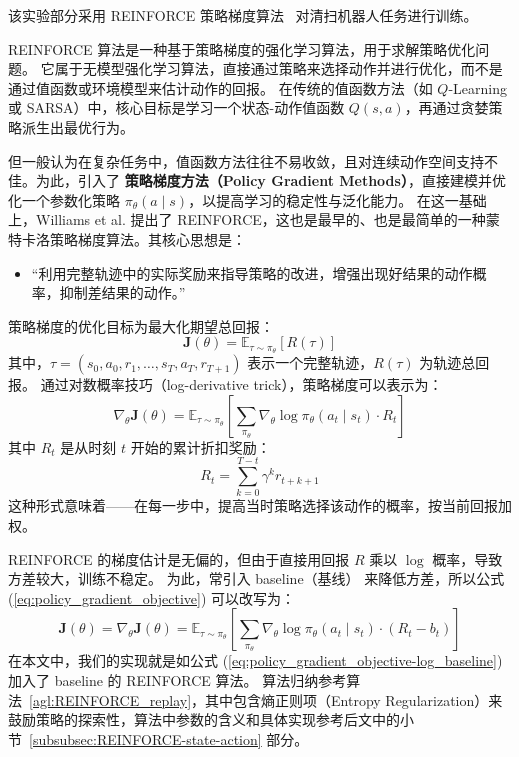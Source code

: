 该实验部分采用 REINFORCE 策略梯度算法~\cite{DBLP:journals/ml/Williams92} 对清扫机器人任务进行训练。

REINFORCE 算法是一种基于策略梯度的强化学习算法，用于求解策略优化问题。
它属于无模型强化学习算法，直接通过策略来选择动作并进行优化，而不是通过值函数或环境模型来估计动作的回报。
在传统的值函数方法（如 \(Q\)-Learning 或 SARSA）中，核心目标是学习一个状态-动作值函数 \(Q \left( s, a \right)\)，再通过贪婪策略派生出最优行为。

但一般认为在复杂任务中，值函数方法往往不易收敛，且对连续动作空间支持不佳。为此，引入了 \textbf{策略梯度方法（Policy Gradient Methods）}，直接建模并优化一个参数化策略 \(\pi_{\theta} \left( a \mid s \right) \)，以提高学习的稳定性与泛化能力。
在这一基础上，Williams et al. 提出了 REINFORCE，这也是最早的、也是最简单的一种蒙特卡洛策略梯度算法。其核心思想是：
\begin{itemize}
    \item “利用完整轨迹中的实际奖励来指导策略的改进，增强出现好结果的动作概率，抑制差结果的动作。”
\end{itemize}

策略梯度的优化目标为最大化期望总回报：
\begin{equation}\label{eq:policy_gradient_objective}
    \mathbf{J} \left( \theta \right) = \mathbb{E}_{\tau \sim \pi_{\theta}} \left[ R \left( \tau \right) \right]
\end{equation}
其中，\(\tau = \left(s_0, a_0, r_1, \dots, s_T, a_T, r_{T+1}\right)\) 表示一个完整轨迹，\(R \left( \tau \right)\) 为轨迹总回报。
通过对数概率技巧（log-derivative trick），策略梯度可以表示为：
\begin{equation}\label{eq:policy_gradient-log}
    \nabla_{\theta} \mathbf{J} \left( \theta \right) = \mathbb{E}_{\tau \sim \pi_{\theta}} \left[ \sum_{\pi_\theta} \nabla_{\theta} \log \pi_{\theta} \left( a_t \mid s_t \right) \cdot R_t \right]
\end{equation}
其中 \(R_t\) 是从时刻 \(t\) 开始的累计折扣奖励：
\[
    R_t = \sum_{k=0}^{T-t} \gamma^k r_{t+k+1}
\]
这种形式意味着——在每一步中，提高当时策略选择该动作的概率，按当前回报加权。

REINFORCE 的梯度估计是无偏的，但由于直接用回报 \(R\) 乘以 \(\log\) 概率，导致方差较大，训练不稳定。
为此，常引入 baseline（基线） 来降低方差，所以公式 (\ref{eq:policy_gradient_objective}) 可以改写为：
\begin{equation}\label{eq:policy_gradient_objective-log_baseline}
    \mathbf{J} \left( \theta \right) = \nabla_{\theta} \mathbf{J} \left( \theta \right) = \mathbb{E}_{\tau \sim \pi_{\theta}} \left[ \sum_{\pi_\theta} \nabla_{\theta} \log \pi_{\theta} \left( a_t \mid s_t \right) \cdot \left( R_t - b_t \right) \right]
\end{equation}
在本文中，我们的实现就是如公式 (\ref{eq:policy_gradient_objective-log_baseline}) 加入了 baseline 的 REINFORCE 算法。
算法归纳参考算法~\ref{agl:REINFORCE_replay}，其中包含熵正则项（Entropy Regularization）来鼓励策略的探索性，算法中参数的含义和具体实现参考后文中的小节~\ref{subsubsec:REINFORCE-state-action} 部分。

